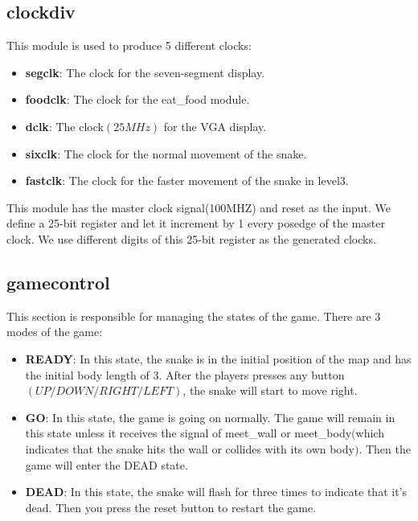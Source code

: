 \documentclass[12pt]{article}
\begin{document}
\subsection*{clockdiv}
This module is used to produce 5 different clocks:
\begin{itemize}
\item \textbf{segclk}: The clock for the seven-segment display.
\item \textbf{foodclk}: The clock for the eat\_food module.
\item \textbf{dclk}: The clock$(25MHz)$ for the VGA display. 
\item \textbf{sixclk}: The clock for the normal movement of the snake.
\item \textbf{fastclk}: The clock for the faster movement of the snake in level3.     
\end{itemize}
This module has the master clock signal(100MHZ) and reset as the input. We define a 25-bit register and let it increment by 1 every posedge of the master clock. We use different digits of this 25-bit register as the generated clocks.


\subsection*{gamecontrol}
This section is responsible for managing the states of the game. There are 3 modes of the game:
\begin{itemize}
\item \textbf{READY}: In this state, the snake is in the initial position of the map and has the initial body length of 3. After the players presses any button$(UP/DOWN/RIGHT/LEFT)$, the snake will start to move right.
\item \textbf{GO}: In this state, the game is going on normally. The game will remain in this state unless it receives the signal of meet\_wall or meet\_body$($which indicates that the snake hits the wall or collides with its own body$)$. Then the game will enter the DEAD state.
\item \textbf{DEAD}: In this state, the snake will flash for three times to indicate that it's dead. Then you press the reset button to restart the game. 
\end{itemize}
\end{document}
